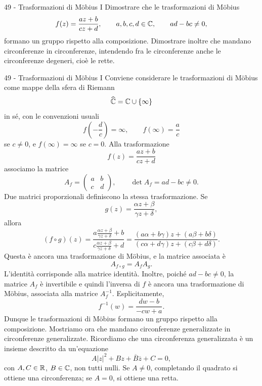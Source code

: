 \documentclass[a4paper]{article}
\begin{document}
\begin{snippetexercise}{49 - Trasformazioni di Möbius I}
    Dimostrare che le trasformazioni di Möbius
    \[
        f(z)=\frac{az+b}{cz+d},
        \qquad
        a,b,c,d\in\mathbb{C},
        \qquad
        ad-bc\neq 0,
    \]
    formano un gruppo rispetto alla composizione. Dimostrare inoltre
    che mandano circonferenze in circonferenze, intendendo fra le
    circonferenze anche le circonferenze degeneri, cioè le rette.
\end{snippetexercise}

\begin{snippetsolution}{49 - Trasformazioni di Möbius I}
    Conviene considerare le trasformazioni di Möbius come mappe della sfera di Riemann
    \[
        \widehat{\mathbb{C}}=\mathbb{C}\cup\{\infty\}
    \]
    in sé, con le convenzioni usuali
    \[
        f\left(-\frac dc\right)=\infty,
        \qquad
        f(\infty)=\frac ac
    \]
    se \(c\neq0\), e \(f(\infty)=\infty\) se \(c=0\).
    Alla trasformazione
    \[
        f(z)=\frac{az+b}{cz+d}
    \]
    associamo la matrice
    \[
        A_f=
        \begin{pmatrix}
            a & b\\
            c & d
        \end{pmatrix},
        \qquad
        \det A_f=ad-bc\neq0.
    \]
    Due matrici proporzionali definiscono la stessa trasformazione. Se
    \[
        g(z)=\frac{\alpha z+\beta}{\gamma z+\delta},
    \]
    allora
    \[
        (f\circ g)(z)
        =
        \frac{a\frac{\alpha z+\beta}{\gamma z+\delta}+b}{c\frac{\alpha z+\beta}{\gamma z+\delta}+d}
        =
        \frac{(a\alpha+b\gamma)z+(a\beta+b\delta)}{(c\alpha+d\gamma)z+(c\beta+d\delta)}.
    \]
    Questa è ancora una trasformazione di Möbius, e la matrice associata è
    \[
        A_{f\circ g}=A_fA_g.
    \]
    L'identità corrisponde alla matrice identità. Inoltre, poiché \(ad-bc\neq0\), la matrice \(A_f\) è invertibile e quindi l'inversa di \(f\) è ancora una trasformazione di Möbius, associata alla matrice \(A_f^{-1}\). Esplicitamente,
    \[
        f^{-1}(w)=\frac{dw-b}{-cw+a}.
    \]
    Dunque le trasformazioni di Möbius formano un gruppo rispetto alla composizione.
    Mostriamo ora che mandano circonferenze generalizzate in circonferenze generalizzate. Ricordiamo che una circonferenza generalizzata è un insieme descritto da un'equazione
    \[
        A|z|^2+Bz+\overline{B}\overline z+C=0,
    \]
    con \(A,C\in\mathbb{R}\), \(B\in\mathbb{C}\), non tutti nulli. Se \(A\neq0\), completando il quadrato si ottiene una circonferenza; se \(A=0\), si ottiene una retta.

\end{snippetsolution}
\end{document}
